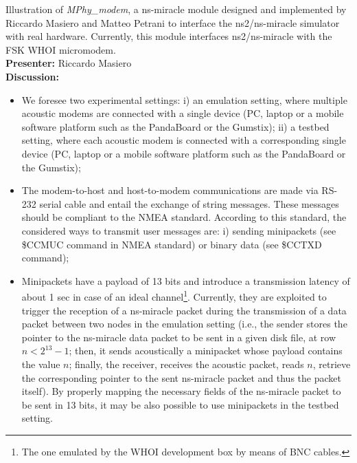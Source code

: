 \documentclass[11pt,journal,draftclsnofoot,onecolumn,twoside,letterpaper]{IEEEtran}
\theoremstyle{definition} \newtheorem{definition}[]{Definition}
\theoremstyle{theorem} \newtheorem{theorem}[]{Theorem}
\begin{document}
 Illustration of {\it MPhy\_modem}, a ns-miracle module designed and implemented by Riccardo Masiero and Matteo Petrani to interface the ns2/ns-miracle simulator with real hardware. Currently, this module interfaces ns2/ns-miracle with the FSK WHOI micromodem.\\
{\bf Presenter:} Riccardo Masiero\\
{\bf Discussion:} 
\begin{itemize}
 \item We foresee two experimental settings: i) an emulation setting, where multiple acoustic modems are connected with a single device (PC, laptop or a mobile software platform such as the PandaBoard or the Gumstix); ii) a testbed setting, where each acoustic modem is connected with a corresponding single device (PC, laptop or a mobile software platform such as the PandaBoard or the Gumstix);
 \item The modem-to-host and host-to-modem communications are made via RS-232 serial cable and entail the exchange of string messages. These messages should be compliant to the NMEA standard. According to this standard, the considered ways to transmit user messages are: i) sending minipackets (see \$CCMUC command in NMEA standard) or binary data (see \$CCTXD command);
 \item Minipackets have a payload of 13 bits and introduce a transmission latency of about 1 sec in case of an ideal channel\footnote{The one emulated by the WHOI development box by means of BNC cables.}. Currently, they are exploited to trigger the reception of a ns-miracle packet during the transmission of a data packet between two nodes in the emulation setting (i.e., the sender stores the pointer to the ns-miracle data packet to be sent in a given disk file, at row $n < 2^{13}-1$; then, it sends acoustically a minipacket whose payload contains the value $n$; finally, the receiver, receives the acoustic packet, reads $n$, retrieve the corresponding pointer to the sent ns-miracle packet and thus the packet itself). By properly mapping the necessary fields of the ns-miracle packet to be sent in 13 bits, it may be also possible to use minipackets in the testbed setting.

\end{itemize}
\end{document}
